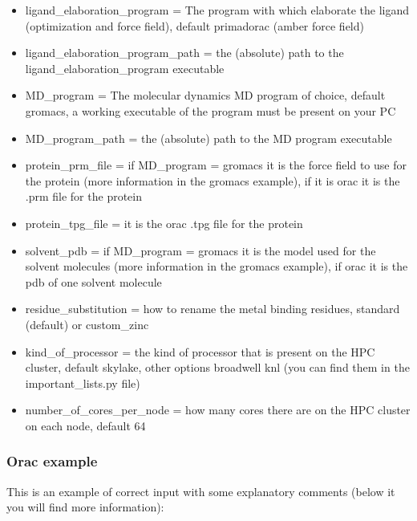 \begin{itemize}
				\item ligand\_elaboration\_program = The program with which elaborate the ligand (optimization and force field), default primadorac (amber force field)
				
				\item ligand\_elaboration\_program\_path = the (absolute) path to the ligand\_elaboration\_program executable

				
				\item MD\_program = The molecular dynamics MD program of choice, default gromacs, a working executable of the program must be present on your PC
				
				\item MD\_program\_path = the (absolute) path to the MD program executable
				
				\item protein\_prm\_file = if MD\_program = gromacs it is the force field to use for the protein (more information in the gromacs example), if it is orac it is the .prm file for the protein
				
				\item protein\_tpg\_file = it is the orac .tpg file for the protein
				
				\item solvent\_pdb = if MD\_program = gromacs it is the model used for the solvent molecules (more information in the gromacs example), if orac it is the pdb of one solvent molecule

				\item residue\_substitution = how to rename the metal binding residues, standard (default) or custom\_zinc\cite{zinc_substitutions}
				
				\item kind\_of\_processor = the kind of processor that is present on the HPC cluster, default skylake, other options broadwell knl (you can find them in the important\_lists.py file)
				
				\item number\_of\_cores\_per\_node = how many cores there are on the HPC cluster on each node, default 64
				
			\end{itemize}
	
				\subsubsection*{Orac example}
				
					This is an example of correct input with some explanatory comments (below it you will find more information):
					
